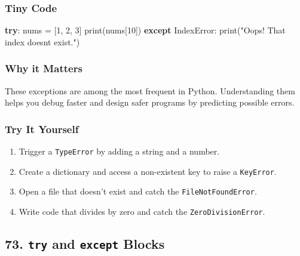 \documentclass[
  letterpaper,
  DIV=11,
  numbers=noendperiod]{scrreprt}
\newenvironment{Shaded}{\begin{snugshade}}{\end{snugshade}}
\newcommand{\BuiltInTok}[1]{\textcolor[rgb]{0.00,0.23,0.31}{#1}}
\newcommand{\ControlFlowTok}[1]{\textcolor[rgb]{0.00,0.23,0.31}{\textbf{#1}}}
\newcommand{\DecValTok}[1]{\textcolor[rgb]{0.68,0.00,0.00}{#1}}
\newcommand{\NormalTok}[1]{\textcolor[rgb]{0.00,0.23,0.31}{#1}}
\newcommand{\OperatorTok}[1]{\textcolor[rgb]{0.37,0.37,0.37}{#1}}
\newcommand{\PreprocessorTok}[1]{\textcolor[rgb]{0.68,0.00,0.00}{#1}}
\newcommand{\StringTok}[1]{\textcolor[rgb]{0.13,0.47,0.30}{#1}}
\providecommand{\tightlist}{%
  \setlength{\itemsep}{0pt}\setlength{\parskip}{0pt}}
\begin{document}
\subsubsection{Tiny Code}\label{tiny-code-71}

\begin{Shaded}
\begin{Highlighting}[]
\ControlFlowTok{try}\NormalTok{:}
\NormalTok{    nums }\OperatorTok{=}\NormalTok{ [}\DecValTok{1}\NormalTok{, }\DecValTok{2}\NormalTok{, }\DecValTok{3}\NormalTok{]}
    \BuiltInTok{print}\NormalTok{(nums[}\DecValTok{10}\NormalTok{])}
\ControlFlowTok{except} \PreprocessorTok{IndexError}\NormalTok{:}
    \BuiltInTok{print}\NormalTok{(}\StringTok{"Oops! That index doesn\textquotesingle{}t exist."}\NormalTok{)}
\end{Highlighting}
\end{Shaded}

\subsubsection{Why it Matters}\label{why-it-matters-71}

These exceptions are among the most frequent in Python. Understanding
them helps you debug faster and design safer programs by predicting
possible errors.

\subsubsection{Try It Yourself}\label{try-it-yourself-71}

\begin{enumerate}
\def\labelenumi{\arabic{enumi}.}
\tightlist
\item
  Trigger a \texttt{TypeError} by adding a string and a number.
\item
  Create a dictionary and access a non-existent key to raise a
  \texttt{KeyError}.
\item
  Open a file that doesn't exist and catch the
  \texttt{FileNotFoundError}.
\item
  Write code that divides by zero and catch the
  \texttt{ZeroDivisionError}.
\end{enumerate}

\subsection{\texorpdfstring{73. \texttt{try} and \texttt{except}
Blocks}{73. try and except Blocks}}\label{try-and-except-blocks}
\end{document}
